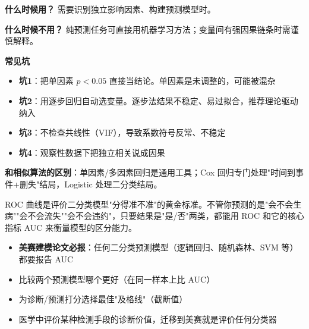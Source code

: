 \begin{algonotes}
\textbf{什么时候用？} 需要识别独立影响因素、构建预测模型时。

\textbf{什么时候不用？} 纯预测任务可直接用机器学习方法；变量间有强因果链条时需谨慎解释。

\textbf{常见坑}
\begin{itemize}
    \item \textbf{坑1}：把单因素 $p<0.05$ 直接当结论。单因素是未调整的，可能被混杂
    \item \textbf{坑2}：用逐步回归自动选变量。逐步法结果不稳定、易过拟合，推荐理论驱动纳入
    \item \textbf{坑3}：不检查共线性（VIF），导致系数符号反常、不稳定
    \item \textbf{坑4}：观察性数据下把独立相关说成因果
\end{itemize}

\textbf{和相似算法的区别}：单因素/多因素回归是通用工具；Cox 回归专门处理"时间到事件+删失"结局，Logistic 处理二分类结局。
\end{algonotes}


\begin{algointro}
ROC 曲线是评价二分类模型"分得准不准"的黄金标准。不管你预测的是"会不会生病""会不会流失""会不会违约"，只要结果是"是/否"两类，都能用 ROC 和它的核心指标 AUC 来衡量模型的区分能力。
\end{algointro}

\begin{algoscene}
\begin{itemize}
    \item \textbf{美赛建模论文必报}：任何二分类预测模型（逻辑回归、随机森林、SVM 等）都要报告 AUC
    \item 比较两个预测模型哪个更好（在同一样本上比 AUC）
    \item 为诊断/预测打分选择最佳"及格线"（截断值）
    \item 医学中评价某种检测手段的诊断价值，迁移到美赛就是评价任何分类器
\end{itemize}
\end{algoscene}

